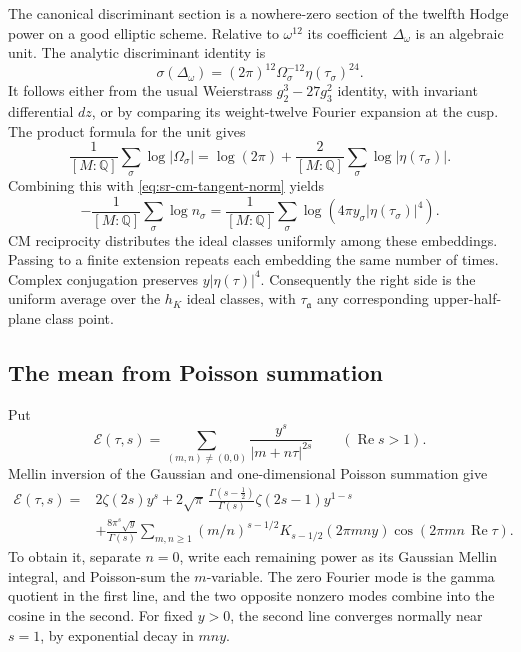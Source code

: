 The canonical discriminant section is a nowhere-zero
section of the twelfth Hodge power on a good elliptic scheme.
Relative to \(\omega^{12}\) its coefficient
\(\Delta_\omega\) is an algebraic unit.
The analytic discriminant identity is
\[
             \sigma(\Delta_\omega)
               =(2\pi)^{12}\Omega_\sigma^{-12}
                                      \eta(\tau_\sigma)^{24}.
\]
It follows either from the usual Weierstrass
\(g_2^3-27g_3^2\) identity, with invariant differential
\(dz\), or by comparing its weight-twelve Fourier
expansion at the cusp.
The product formula for the unit gives
\[
 \frac1{[M:\mathbb Q]}\sum_\sigma\log|\Omega_\sigma|
       =\log(2\pi)+
          \frac2{[M:\mathbb Q]}\sum_\sigma
                                      \log|\eta(\tau_\sigma)|.
\]
Combining this with
\eqref{eq:sr-cm-tangent-norm} yields
\begin{equation}\label{eq:sr-cm-eta-mean}
 -\frac1{[M:\mathbb Q]}\sum_\sigma\log n_\sigma
       =\frac1{[M:\mathbb Q]}\sum_\sigma
                  \log\!\left(4\pi y_\sigma
                                      |\eta(\tau_\sigma)|^4\right).
\end{equation}
CM reciprocity distributes the ideal classes uniformly
among these embeddings.
Passing to a finite extension repeats each embedding the
same number of times.  Complex conjugation preserves
\(y|\eta(\tau)|^4\).
Consequently the right side is the uniform average over
the \(h_K\) ideal classes, with \(\tau_\mathfrak a\)
any corresponding upper-half-plane class point.

\subsection{The mean from Poisson summation}

Put
\[
 \mathcal E(\tau,s)
    =\sum_{(m,n)\ne(0,0)}
                  \frac{y^s}{|m+n\tau|^{2s}}
                  \qquad(\operatorname{Re}s>1).
\]
Mellin inversion of the Gaussian and one-dimensional
Poisson summation give
\[
 \begin{split}
 \mathcal E(\tau,s)
   ={}&2\zeta(2s)y^s
       +2\sqrt\pi\,
          \frac{\Gamma(s-\tfrac12)}{\Gamma(s)}
                         \zeta(2s-1)y^{1-s}\\
     &+\frac{8\pi^s\sqrt y}{\Gamma(s)}
        \sum_{m,n\ge1}(m/n)^{s-1/2}
           K_{s-1/2}(2\pi mn y)\cos(2\pi mn\,\operatorname{Re}\tau).
 \end{split}
\]
To obtain it, separate \(n=0\), write each remaining
power as its Gaussian Mellin integral, and Poisson-sum
the \(m\)-variable.
The zero Fourier mode is the gamma quotient in the first
line, and the two opposite nonzero modes combine into
the cosine in the second.
For fixed \(y>0\), the second line converges normally
near \(s=1\), by exponential decay in \(mn y\).

